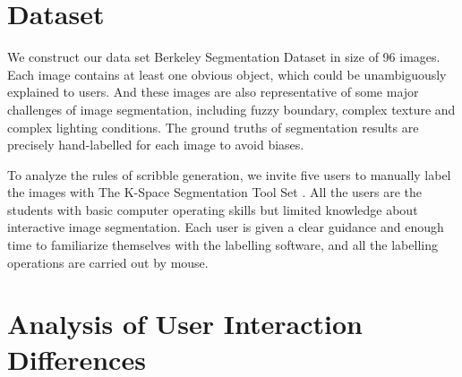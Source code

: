 \documentclass[runningheads,a4paper]{llncs}
\begin{document}
\section{Dataset}
We construct our data set Berkeley Segmentation Dataset \cite{martin2001database} in size of 96 images. Each image contains at least one obvious object, which could be unambiguously explained to users. And these images are also representative of some major challenges of image segmentation, including fuzzy boundary, complex texture and complex lighting conditions. The ground truths of segmentation results are precisely hand-labelled for each image to avoid biases.

To analyze the rules of scribble generation, we invite five users to manually label the images with The K-Space Segmentation Tool Set \cite{mcguinness2008k}. All the users are the students with basic computer operating skills but limited knowledge about interactive image segmentation. Each user is given a clear guidance and enough time to familiarize themselves with the labelling software, and all the labelling operations are carried out by mouse.


\section{Analysis of User Interaction Differences}
\end{document}
